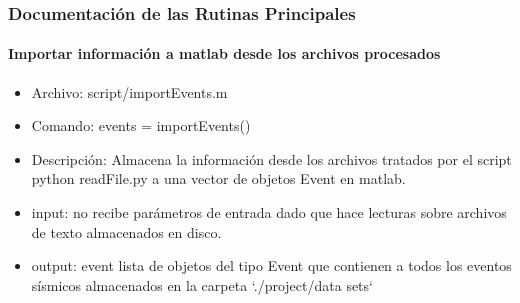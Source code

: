 \subsubsection{Documentación de las Rutinas Principales}

\paragraph{Importar información a matlab desde los archivos procesados}
\begin{itemize}
  \item Archivo: script/importEvents.m
  \item Comando: events = importEvents()
  \item Descripción: Almacena la información desde los archivos tratados por
  el script python readFile.py a una vector de objetos Event en matlab.
  \item input: no recibe parámetros de entrada dado que hace lecturas sobre
  archivos de texto almacenados en disco.
  \item output: event lista de objetos del tipo Event que contienen a todos los
  eventos sísmicos almacenados en la carpeta `./project/data sets`  		 
\end{itemize}


